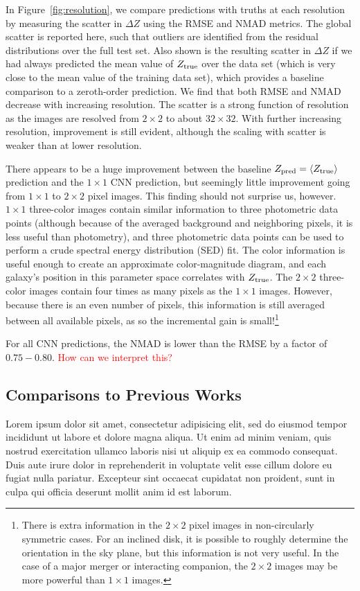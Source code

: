 \documentclass[fleqn,usenatbib]{mnras}
\newcommand{\editorial}[1]{\textcolor{red}{#1}}
\begin{document}
In Figure~\ref{fig:resolution}, we compare predictions with truths at each resolution by measuring the scatter in $\Delta Z$ using the RMSE and NMAD metrics.
The global scatter is reported here, such that outliers are identified from the residual distributions over the full test set.
Also shown is the resulting scatter in $\Delta Z$ if we had always predicted the mean value of $Z_{\rm true}$ over the data set (which is very close to the mean value of the training data set), which provides a baseline comparison to a zeroth-order prediction.
We find that both RMSE and NMAD decrease with increasing resolution.
The scatter is a strong function of resolution as the images are resolved from $2 \times 2$ to about $32 \times 32$.
With further increasing resolution, improvement is still evident, although the scaling with scatter is weaker than at lower resolution.


There appears to be a huge improvement between the baseline $Z_{\rm pred} = \langle Z_{\rm true}\rangle$ prediction and the $1\times 1$ CNN prediction, but seemingly little improvement going from $1 \times 1$ to $2\times 2$ pixel images.
This finding should not surprise us, however.
$1\times 1$ three-color images contain similar information to three photometric data points (although because of the averaged background and neighboring pixels, it is less useful than photometry), and three photometric data points can be used to perform a crude spectral energy distribution (SED) fit.
The color information is useful enough to create an approximate color-magnitude diagram, and each galaxy's position in this parameter space correlates with $Z_{\rm true}$.
The $2 \times 2$ three-color images contain four times as many pixels as the $1\times 1$ images.
However, because there is an even number of pixels, this information is still averaged between all available pixels, as so the incremental gain is small!\footnote{There is extra information in the $2\times 2$ pixel images in non-circularly symmetric cases. For an inclined disk, it is possible to roughly determine the orientation in the sky plane, but this information is not very useful. In the case of a major merger or interacting companion, the $2\times 2$ images may be more powerful than $1 \times 1$ images.}

For all CNN predictions, the NMAD is lower than the RMSE by a factor of $0.75-0.80$.
\editorial{How can we interpret this?}




\subsection{Comparisons to Previous Works}\label{sec:previous work}
Lorem ipsum dolor sit amet, consectetur adipisicing elit, sed do eiusmod tempor incididunt ut labore et dolore magna aliqua. Ut enim ad minim veniam, quis nostrud exercitation ullamco laboris nisi ut aliquip ex ea commodo consequat. Duis aute irure dolor in reprehenderit in voluptate velit esse cillum dolore eu fugiat nulla pariatur. Excepteur sint occaecat cupidatat non proident, sunt in culpa qui officia deserunt mollit anim id est laborum.
\end{document}
